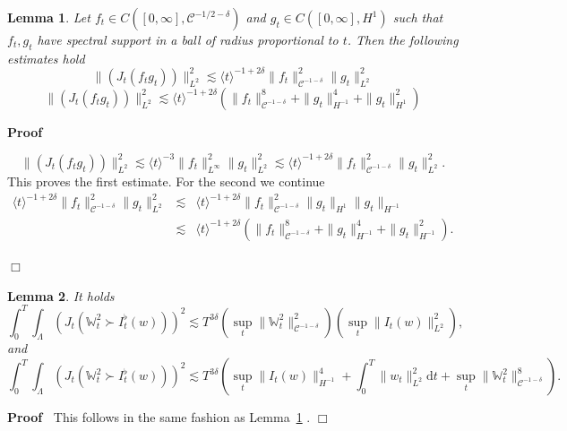 \documentclass[11pt]{article}
\newcommand{\mathd}{\mathrm{d}}
\newenvironment{proof}{\noindent\textbf{Proof\ }}{\hspace*{\fill}$\Box$\medskip}
\newtheorem{lemma}{Lemma}
\newcommand{\VV}{\mathscr{C}}
\begin{document}
\begin{lemma}
  \label{analyticestimate4}Let $f_t \in C \left( [0, \infty], \VV^{- 1 / 2 -
  \delta} \right)$ and $g_t \in C ([0, \infty], H^1)$ such that $f_t, g_t$
  have spectral support in a ball of radius proportional to $t$. Then the
  following estimates hold
  \[ \| (J_t (f_t g_t)) \|_{L^2}^2 \lesssim \langle t \rangle^{- 1 + 2
     \delta} \| f_t \|_{\VV^{- 1 - \delta}}^2 \| g_t \|^2_{L^2} \]
  \[ \| (J_t (f_t g_t)) \|_{L^2}^2 \lesssim \langle t \rangle^{- 1 + 2 \delta}
     \left( \| f_t \|^8_{\VV^{- 1 - \delta}} + \| g_t \|^4_{H^{- 1}} + \| g_t
     \|^2_{H^1} \right) \]
\end{lemma}

\begin{proof}
  
  \[ \| (J_t (f_t g_t)) \|_{L^2}^2 \lesssim \langle t \rangle^{- 3} \| f_t
     \|_{L^{\infty}}^2 \| g_t \|^2_{L^2} \lesssim \langle t \rangle^{- 1 + 2
     \delta} \| f_t \|_{\VV^{- 1 - \delta}}^2 \| g_t \|^2_{L^2} . \]
  This proves the first estimate. For the second we continue
  \begin{eqnarray*}
    \langle t \rangle^{- 1 + 2 \delta} \| f_t \|_{\VV^{- 1 - \delta}}^2 \| g_t
    \|^2_{L^2} & \lesssim & \langle t \rangle^{- 1 + 2 \delta} \| f_t
    \|_{\VV^{- 1 - \delta}}^2 \| g_t \|_{H^1} \| g_t \|_{H^{- 1}}\\
    & \lesssim & \langle t \rangle^{- 1 + 2 \delta} \left( \| f_t \|_{\VV^{-
    1 - \delta}}^8 + \| g_t \|^4_{H^{- 1}} + \| g_t \|^2_{H^{- 1}} \right) .
  \end{eqnarray*}
  
\end{proof}

\begin{lemma}
  \label{analyticestimate5}It holds
  \[ \int^T_0 \int_{\Lambda} (J_t (\mathbb{W}_t^2 \succ I^{\flat}_t (w)))^2
     \lesssim T^{3 \delta} \left( \sup_t \| \mathbb{W}_t^2 \|^2_{\VV^{- 1 -
     \delta}} \right) (\sup_t \| I_t (w) \|^2_{L^2}), \]
  and
  \[ \int^T_0 \int_{\Lambda} (J_t (\mathbb{W}_t^2 \succ I^{\flat}_t (w)))^2
     \lesssim T^{3 \delta} \left( \sup_t \| I_t (w) \|^4_{H^{- 1}} + \int^T_0
     \| w_t \|^2_{L^2} \mathd t + \sup_t \| \mathbb{W}_t^2 \|^8_{\VV^{- 1 -
     \delta}} \right) . \]
  
\end{lemma}

\begin{proof}
  This follows in the same fashion as Lemma~\ref{analyticestimate4} .
\end{proof}
\end{document}
